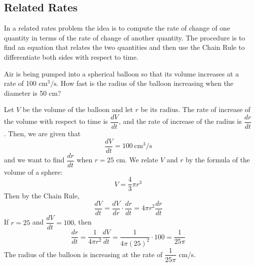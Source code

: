 \subsection{Related Rates}

In a related rates problem the idea is to compute the rate of change of one
quantity in terms of the rate of change of another quantity.
The procedure is to find an equation that relates the two quantities and then
use the Chain Rule to differentiate both sides with respect to time.
\begin{problem}
    Air is being pumped into a spherical balloon so that its volume increases
    at a rate of 100 \(\text{cm}^3/\text{s}\).
    How fast is the radius of the balloon increasing when the diameter is 50
    cm?
\end{problem}
\begin{solution}
    Let \(V\) be the volume of the balloon and let \(r\) be its radius.
    The rate of increase of the volume with respect to time is
    \(\dfrac{dV}{dt}\), and the rate of increase of the radius is
    \(\dfrac{dr}{dt}\).
    Then, we are given that
    \[\frac{dV}{dt}=100\ \text{cm}^3/\text{s}\]
    and we want to find \(\dfrac{dr}{dt}\) when \(r=25\) cm.
    We relate \(V\) and \(r\) by the formula of the volume of a sphere:
    \[V=\frac{4}{3}\pi r^3\]
    Then by the Chain Rule,
    \[\frac{dV}{dt}=\frac{dV}{dr}\cdot\frac{dr}{dt}=4\pi r^2\frac{dr}{dt}\]
    If \(r=25\) and \(\dfrac{dV}{dt}=100\), then
    \[\frac{dr}{dt}=\frac{1}{4\pi r^2}\frac{dV}{dt}
    =\frac{1}{4\pi(25)^2}\cdot100=\frac{1}{25\pi}\]
    The radius of the balloon is increasing at the rate of
    \(\dfrac{1}{25\pi}\) cm/s.
\end{solution}